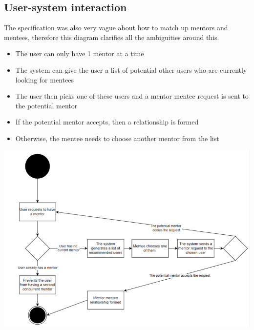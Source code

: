 \documentclass[10pt]{article}
\begin{document}
\subsection{User-system interaction}
The specification was also very vague about how to match up mentors and mentees,
therefore this diagram clarifies all the ambiguities around this.
\begin{itemize}
    \item The user can only have 1 mentor at a time
    \item The system can give the user a list of potential other users who are currently looking for mentees
    \item The user then picks one of these users and a mentor mentee request is sent to the potential mentor
    \item If the potential mentor accepts, then a relationship is formed
    \item Otherwise, the mentee needs to choose another mentor from the list
\end{itemize}
\includegraphics[scale=0.7]{MentorMentee}
\end{document}
